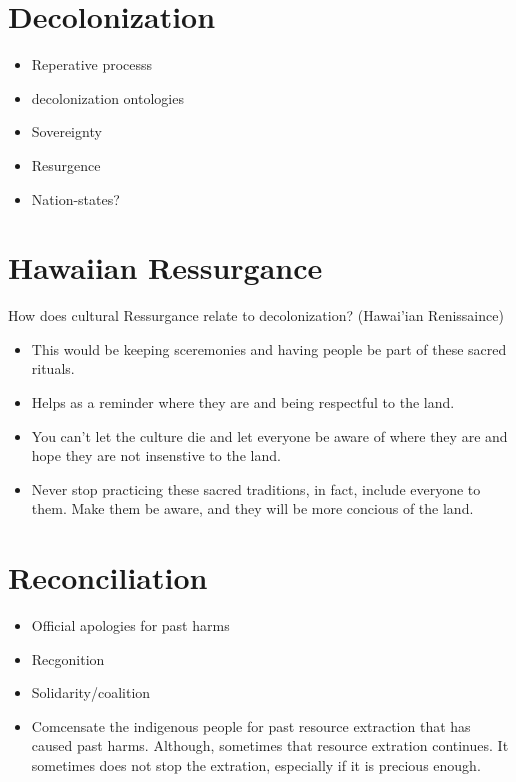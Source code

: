 \documentclass{article}
\begin{document}
\section*{Decolonization}
\begin{itemize}
  \item Reperative processs
  \item decolonization ontologies
  \item Sovereignty
  \item Resurgence
  \item Nation-states?
\end{itemize}

\section*{Hawaiian Ressurgance}
How does cultural Ressurgance relate to decolonization?
(Hawai'ian Renissaince)

\begin{itemize}
  \item This would be keeping sceremonies and having people
    be part of these sacred rituals.
  \item Helps as a reminder where they are and being respectful to the land.
  \item You can't let the culture die and let everyone be aware of where they are
    and hope they are not insenstive to the land.
  \item Never stop practicing these sacred traditions, in fact, include everyone
    to them. Make them be aware, and they will be more concious of the land.
\end{itemize}

\section*{Reconciliation}
\begin{itemize}
  \item Official apologies for past harms
  \item Recgonition
  \item Solidarity/coalition
  \item Comcensate the indigenous people for past resource extraction that has caused 
    past harms. Although, sometimes that resource extration continues.
    It sometimes does not stop the extration, especially if it is precious enough.
\end{itemize}
\end{document}
